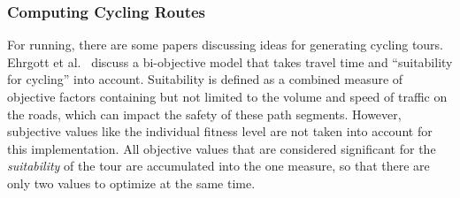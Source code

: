 %
%


\subsubsection{Computing Cycling Routes}
\label{subsubsec:cyclingRoutes}

For running, there are some papers discussing ideas for generating cycling tours.
Ehrgott et al.\ \cite{ehrgott_bi-objective_2012}  discuss a bi-objective model that takes travel time and \enquote{suitability for cycling} into account.
Suitability is defined as a combined measure of objective factors containing but not limited to the volume and speed of traffic on the roads, which can impact the safety of these path segments. 
However, subjective values like the individual fitness level are not taken into account for this implementation.
All objective values that are considered significant for the \textit{suitability} of the tour are accumulated into the one measure, so that there are only two values to optimize at the same time. 

